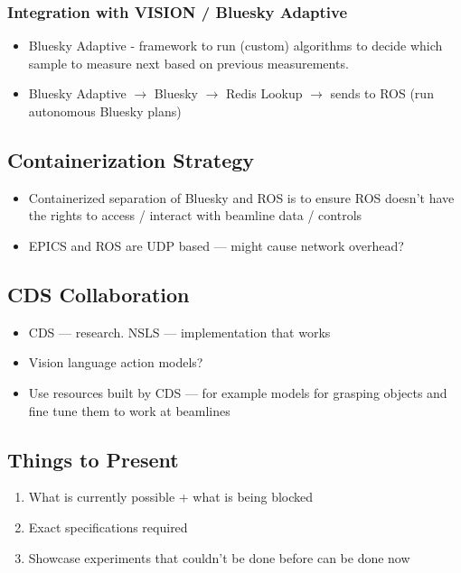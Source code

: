 \documentclass[12pt, a4paper]{article}
\begin{document}
\subsubsection*{Integration with VISION / Bluesky Adaptive}
\begin{itemize}
    \item Bluesky Adaptive - framework to run (custom) algorithms to decide which sample to measure next based on previous measurements.
    \item Bluesky Adaptive $\rightarrow$ Bluesky $\rightarrow$ Redis Lookup $\rightarrow$ sends to ROS (run autonomous Bluesky plans)
\end{itemize}

\subsection*{Containerization Strategy}
\begin{itemize}
    \item Containerized separation of Bluesky and ROS is to ensure ROS doesn't have the rights to access / interact with beamline data / controls
    \item  EPICS and ROS are UDP based --- might cause network overhead?
\end{itemize}

\subsection*{CDS Collaboration}
\begin{itemize}
    \item CDS --- research. NSLS --- implementation that works
    \item Vision language action models?
    \item Use resources built by CDS --- for example models for grasping objects and fine tune them to work at beamlines
\end{itemize}

\subsection*{Things to Present}
\begin{enumerate}
    \item What is currently possible + what is being blocked
    \item Exact specifications required
    \item Showcase experiments that couldn't be done before can be done now
\end{enumerate}
\end{document}
